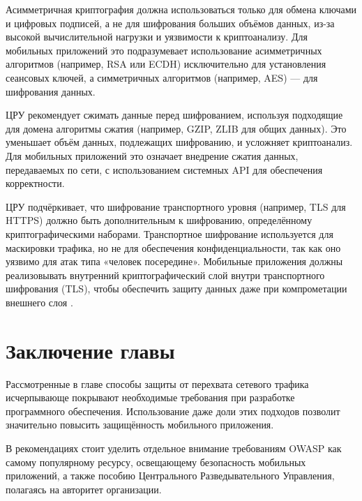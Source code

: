 Асимметричная криптография должна использоваться только для обмена ключами и цифровых подписей, а не для шифрования больших объёмов данных, из-за высокой вычислительной нагрузки и уязвимости к криптоанализу. Для мобильных приложений это подразумевает использование асимметричных алгоритмов (например, RSA или ECDH) исключительно для установления сеансовых ключей, а симметричных алгоритмов (например, AES) — для шифрования данных.

ЦРУ рекомендует сжимать данные перед шифрованием, используя подходящие для домена алгоритмы сжатия (например, GZIP, ZLIB для общих данных). Это уменьшает объём данных, подлежащих шифрованию, и усложняет криптоанализ. Для мобильных приложений это означает внедрение сжатия данных, передаваемых по сети, с использованием системных API для обеспечения корректности.

ЦРУ подчёркивает, что шифрование транспортного уровня (например, TLS для HTTPS) должно быть дополнительным к шифрованию, определённому криптографическими наборами. Транспортное шифрование используется для маскировки трафика, но не для обеспечения конфиденциальности, так как оно уязвимо для атак типа «человек посередине». Мобильные приложения должны реализовывать внутренний криптографический слой внутри транспортного шифрования (TLS), чтобы обеспечить защиту данных даже при компрометации внешнего слоя \cite{nist_sp800_52}.

\section{Заключение главы}

Рассмотренные в главе способы защиты от перехвата сетевого трафика исчерпывающе покрывают необходимые требования при разработке программного обеспечения. Использование даже доли этих подходов позволит значительно повысить защищённость мобильного приложения.

В рекомендациях стоит уделить отдельное внимание требованиям OWASP как самому популярному ресурсу, освещающему безопасность мобильных приложений, а также пособию Центрального Разведывательного Управления, полагаясь на авторитет организации.

